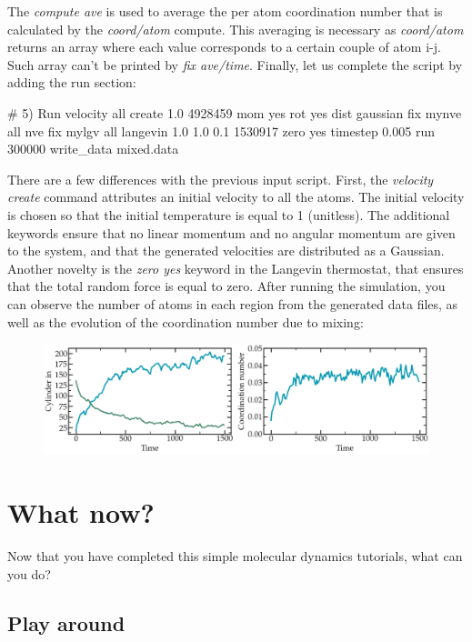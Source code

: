 \noindent The \textit{compute ave} is used to average the per atom
coordination number that is calculated by the \textit{coord/atom} compute.
This averaging is necessary as \textit{coord/atom} returns an array where each value corresponds 
to a certain couple of atom i-j. Such array can't be printed by \textit{fix ave/time}. 
Finally, let us complete the script by adding the run section:

\begin{lcverbatim}
# 5) Run
velocity all create 1.0 4928459 mom yes rot yes dist gaussian
fix mynve all nve
fix mylgv all langevin 1.0 1.0 0.1 1530917 zero yes
timestep 0.005
run 300000
write_data mixed.data
\end{lcverbatim}

\noindent There are a few differences with the
previous input script. First, the \textit{velocity create}
command attributes an initial velocity to all the atoms.
The initial velocity is chosen so that the initial
temperature is equal to 1 (unitless). The additional
keywords ensure that no linear momentum and no angular
momentum are given to the system, and that the generated
velocities are distributed as a Gaussian. Another novelty
is the \textit{zero yes} keyword in the Langevin thermostat, that
ensures that the total random force is equal to zero.
After running the simulation, you can observe the number
of atoms in each region from the generated data files, as
well as the evolution of the coordination number due to
mixing:

\begin{figure}[h!]
\includegraphics[width=\linewidth]{tutorials/level0/lennard-jones-fluid/population-light.png}
\end{figure}

\section{What now?}

\noindent Now that you have completed this simple molecular dynamics tutorials, what can you do?

\subsection{Play around}

